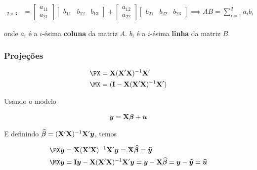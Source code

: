 \documentclass[11pt, oneside, a4paper, article]{article}
\numberwithin{equation}{section}
\begin{document}
\begin{description}
\begin{align*}
	[AB]_{2 \times 3} &=
	\begin{bmatrix}
		a_{11} \\ a_{21}
	\end{bmatrix}
	\begin{bmatrix}
		b_{11} & b_{12} & b_{13}
	\end{bmatrix}
	+
	\begin{bmatrix}
		a_{12} \\ a_{22}
	\end{bmatrix}
	\begin{bmatrix}
		b_{21} & b_{22} & b_{23}
	\end{bmatrix}
	\implies
	AB = \sum_{i=1}^{2} a_{i}b_{i}
\end{align*}

\noindent
onde
$a_{i}$ é a $i$-ésima \textbf{coluna} da matriz $A$.
$b_{i}$ é a $i$-ésima \textbf{linha} da matriz $B$.

\subsubsection{Projeções}

\vspace{-2 em}
\begin{align*}
	\PX &= \Xmat (\Xmat' \Xmat)^{-1} \Xmat'
	\\
	\MX &= (\Imat - \Xmat (\Xmat' \Xmat)^{-1} \Xmat')
\end{align*}

Usando o modelo

\vspace{-1 em}
\begin{align*}
	\boldsymbol{y} = \mathbf{X} \boldsymbol{\beta} + \boldsymbol{u}
\end{align*}

E definindo $\widehat{\boldsymbol{\beta}} = (\mathbf{X}' \mathbf{X})^{-1} \mathbf{X}' \boldsymbol{y}$, temos

\vspace{-1 em}
\begin{align*}
	\PX \yvec  &= \Xmat (\Xmat' \Xmat)^{-1} \Xmat' \yvec = \Xmat \betavechat = \widehat{\yvec}
	\\
	\MX \yvec  &= \Imat \yvec  - \Xmat (\Xmat' \Xmat)^{-1} \Xmat' \yvec 
	=
	\yvec  - \Xmat \betavechat 
	=
	\yvec - \widehat{\yvec} = \uvechat
\end{align*}


\end{description}
\end{document}
